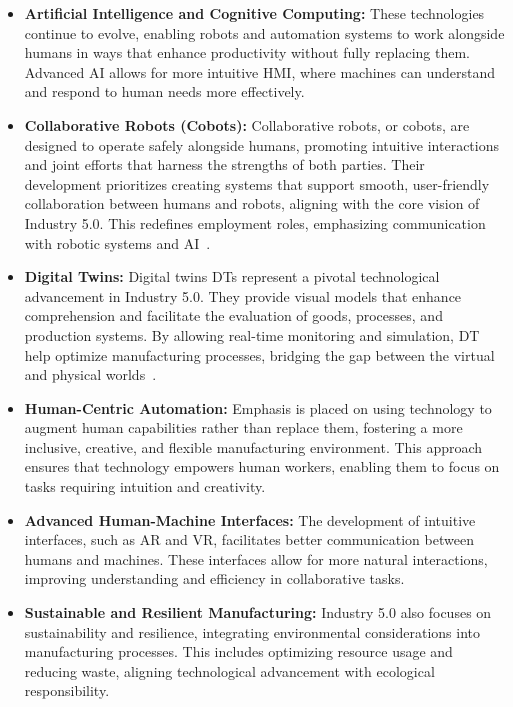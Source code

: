 \begin{itemize}
    \item \textbf{Artificial Intelligence and Cognitive Computing:} These technologies continue to evolve, enabling robots and automation systems to work alongside humans in ways that enhance productivity without fully replacing them. Advanced \ac{AI} allows for more intuitive \ac{HMI}, where machines can understand and respond to human needs more effectively.

    \item \textbf{Collaborative Robots (Cobots):} Collaborative robots, or cobots, are designed to operate safely alongside humans, promoting intuitive interactions and joint efforts that harness the strengths of both parties. Their development prioritizes creating systems that support smooth, user-friendly collaboration between humans and robots, aligning with the core vision of Industry 5.0. This redefines employment roles, emphasizing communication with robotic systems and \ac{AI}~\cite{10577684}.

    \item \textbf{Digital Twins:} Digital twins \ac{DTs} represent a pivotal technological advancement in Industry 5.0. They provide visual models that enhance comprehension and facilitate the evaluation of goods, processes, and production systems. By allowing real-time monitoring and simulation, \ac{DT} help optimize manufacturing processes, bridging the gap between the virtual and physical worlds~\cite{10577684}.

    \item \textbf{Human-Centric Automation:} Emphasis is placed on using technology to augment human capabilities rather than replace them, fostering a more inclusive, creative, and flexible manufacturing environment. This approach ensures that technology empowers human workers, enabling them to focus on tasks requiring intuition and creativity.

    \item \textbf{Advanced Human-Machine Interfaces:} The development of intuitive interfaces, such as \ac{AR} and \ac{VR}, facilitates better communication between humans and machines. These interfaces allow for more natural interactions, improving understanding and efficiency in collaborative tasks.

    \item \textbf{Sustainable and Resilient Manufacturing:} Industry 5.0 also focuses on sustainability and resilience, integrating environmental considerations into manufacturing processes. This includes optimizing resource usage and reducing waste, aligning technological advancement with ecological responsibility.
\end{itemize}

